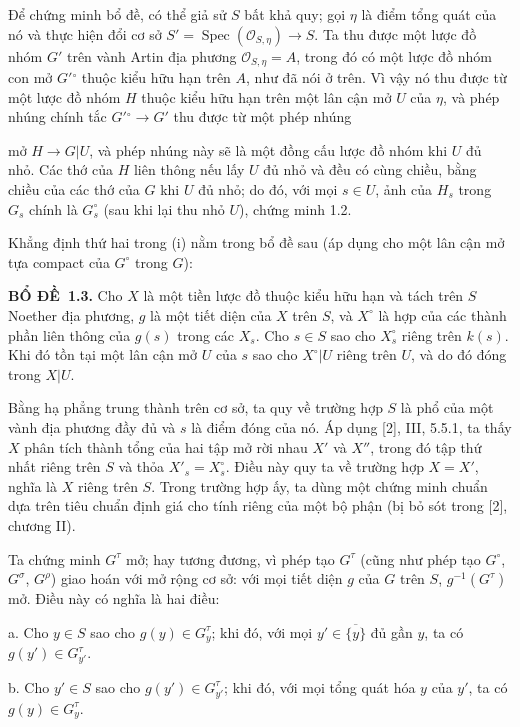 \documentclass[11pt,twoside,openany]{book}
\numberwithin{equation}{section}
\newcommand{\src}[1]{%
  \phantomsection\hypertarget{src:\fgasourceid:#1}{}%
  \marginpar{\raggedleft\footnotesize\sffamily #1}%
}
\newcommand{\fgasourceid}{unset}
\newcommand{\result}[2]{\par\medskip\noindent\textbf{#1\if\relax\detokenize{#2}\relax\else\ #2\fi.}\quad}
\begin{document}
Để chứng minh bổ đề, có thể giả sử $S$ bất khả quy; gọi $\eta$ là điểm tổng
quát của nó và thực hiện đổi cơ sở
$S'=\operatorname{Spec}(\mathcal O_{S,\eta})\longrightarrow S$. Ta thu được
một lược đồ nhóm $G'$ trên vành Artin địa phương
$\mathcal O_{S,\eta}=A$, trong đó có một lược đồ nhóm con mở
$G'{}^\circ$ thuộc kiểu hữu hạn trên $A$, như đã nói ở trên. Vì vậy nó thu
được từ một lược đồ nhóm $H$ thuộc kiểu hữu hạn trên một lân cận mở $U$ của
$\eta$, và phép nhúng chính tắc $G'{}^\circ\longrightarrow G'$ thu được từ
một phép nhúng
\src{225}
mở $H\longrightarrow G|U$, và phép nhúng này sẽ là một đồng cấu lược đồ nhóm
khi $U$ đủ nhỏ. Các thớ của $H$ liên thông nếu lấy $U$ đủ nhỏ và đều có
cùng chiều, bằng chiều của các thớ của $G$ khi $U$ đủ nhỏ; do đó, với mọi
$s\in U$, ảnh của
$H_s$ trong $G_s$ chính là $G_s^\circ$ (sau khi lại thu nhỏ $U$), chứng minh
1.2.

Khẳng định thứ hai trong (i) nằm trong bổ đề sau (áp dụng cho một lân cận mở
tựa compact của $G^\circ$ trong $G$):

\result{BỔ ĐỀ}{1.3} Cho $X$ là một tiền lược đồ thuộc kiểu hữu hạn và tách
trên $S$ Noether địa phương, $g$ là một tiết diện của $X$ trên $S$, và
$X^\circ$ là hợp của các thành phần liên thông của $g(s)$ trong các $X_s$.
Cho $s\in S$ sao cho $X_s^\circ$ riêng trên $k(s)$. Khi đó tồn tại một lân
cận mở $U$ của $s$ sao cho $X^\circ|U$ riêng trên $U$, và do đó đóng trong
$X|U$.

Bằng hạ phẳng trung thành trên cơ sở, ta quy về trường hợp $S$ là phổ của một
vành địa phương đầy đủ và $s$ là điểm đóng của nó. Áp dụng [2], III, 5.5.1,
ta thấy $X$ phân tích thành tổng của hai tập mở rời nhau $X'$ và $X''$, trong
đó tập thứ nhất riêng trên $S$ và thỏa $X'_s=X_s^\circ$. Điều này quy ta về
trường hợp $X=X'$, nghĩa là $X$ riêng trên $S$. Trong trường hợp ấy, ta dùng
một chứng minh chuẩn dựa trên tiêu chuẩn định giá cho tính riêng của một bộ
phận (bị bỏ sót trong [2], chương II).

Ta chứng minh $G^\tau$ mở; hay tương đương, vì phép tạo $G^\tau$ (cũng như
phép tạo $G^\circ$, $G^\sigma$, $G^\rho$) giao hoán với mở rộng cơ sở: với
mọi tiết diện $g$ của $G$ trên $S$, $g^{-1}(G^\tau)$ mở. Điều này có nghĩa là
hai điều:

\medskip
\noindent a. Cho $y\in S$ sao cho $g(y)\in G_y^\tau$; khi đó, với mọi
$y'\in\overline{\{y\}}$ đủ gần $y$, ta có $g(y')\in G_{y'}^\tau$.

\medskip
\noindent b. Cho $y'\in S$ sao cho $g(y')\in G_{y'}^\tau$; khi đó, với mọi
tổng quát hóa $y$ của $y'$, ta có $g(y)\in G_y^\tau$.
\end{document}
